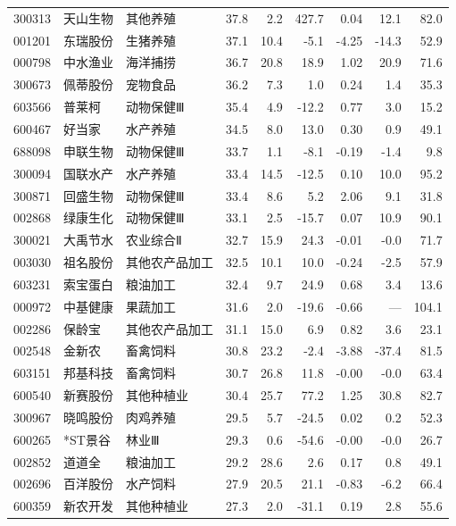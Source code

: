 \begin{longtable}{@{}llp{1.9cm}rrrrrr@{}}
300313 & 天山生物 & 其他养殖 & 37.8 & 2.2 & 427.7 & 0.04 & 12.1 & 82.0 \\
001201 & 东瑞股份 & 生猪养殖 & 37.1 & 10.4 & -5.1 & -4.25 & -14.3 & 52.9 \\
000798 & 中水渔业 & 海洋捕捞 & 36.7 & 20.8 & 18.9 & 1.02 & 20.9 & 71.6 \\
300673 & 佩蒂股份 & 宠物食品 & 36.2 & 7.3 & 1.0 & 0.24 & 1.4 & 35.3 \\
603566 & 普莱柯 & 动物保健Ⅲ & 35.4 & 4.9 & -12.2 & 0.77 & 3.0 & 15.2 \\
600467 & 好当家 & 水产养殖 & 34.5 & 8.0 & 13.0 & 0.30 & 0.9 & 49.1 \\
688098 & 申联生物 & 动物保健Ⅲ & 33.7 & 1.1 & -8.1 & -0.19 & -1.4 & 9.8 \\
300094 & 国联水产 & 水产养殖 & 33.4 & 14.5 & -12.5 & 0.10 & 10.0 & 95.2 \\
300871 & 回盛生物 & 动物保健Ⅲ & 33.4 & 8.6 & 5.2 & 2.06 & 9.1 & 31.8 \\
002868 & 绿康生化 & 动物保健Ⅲ & 33.1 & 2.5 & -15.7 & 0.07 & 10.9 & 90.1 \\
300021 & 大禹节水 & 农业综合Ⅱ & 32.7 & 15.9 & 24.3 & -0.01 & -0.0 & 71.7 \\
003030 & 祖名股份 & 其他农产品加工 & 32.5 & 10.1 & 10.0 & -0.24 & -2.5 & 57.9 \\
603231 & 索宝蛋白 & 粮油加工 & 32.4 & 9.7 & 24.9 & 0.68 & 3.4 & 13.6 \\
000972 & 中基健康 & 果蔬加工 & 31.6 & 2.0 & -19.6 & -0.66 & — & 104.1 \\
002286 & 保龄宝 & 其他农产品加工 & 31.1 & 15.0 & 6.9 & 0.82 & 3.6 & 23.1 \\
002548 & 金新农 & 畜禽饲料 & 30.8 & 23.2 & -2.4 & -3.88 & -37.4 & 81.5 \\
603151 & 邦基科技 & 畜禽饲料 & 30.7 & 26.8 & 11.8 & -0.00 & -0.0 & 63.4 \\
600540 & 新赛股份 & 其他种植业 & 30.4 & 25.7 & 77.2 & 1.25 & 30.8 & 82.7 \\
300967 & 晓鸣股份 & 肉鸡养殖 & 29.5 & 5.7 & -24.5 & 0.02 & 0.2 & 52.3 \\
600265 & *ST景谷 & 林业Ⅲ & 29.3 & 0.6 & -54.6 & -0.00 & -0.0 & 26.7 \\
002852 & 道道全 & 粮油加工 & 29.2 & 28.6 & 2.6 & 0.17 & 0.8 & 49.1 \\
002696 & 百洋股份 & 水产饲料 & 27.9 & 20.5 & 21.1 & -0.83 & -6.2 & 66.4 \\
600359 & 新农开发 & 其他种植业 & 27.3 & 2.0 & -31.1 & 0.19 & 2.8 & 55.6 \\

\end{longtable}
